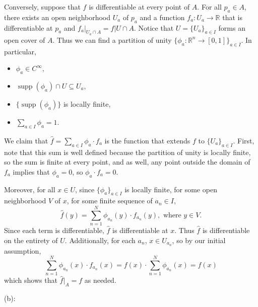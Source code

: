 \documentclass{article}
\theoremstyle{plain} %
\numberwithin{thm}{section} %
\theoremstyle{definition}
\begin{document}
\begin{question}{36}

        Conversely, suppose that \(f\) is differentiable at every point of \(A\). For all \(p_a \in A\), there exists an open neighborhood \(U_a\) of \(p_a\) and a function \(f_a : U_a \to \mathbb{R}\) that is differentiable at \(p_a\) and \(f_a \vert _{U_a \cap A} = f \vert U \cap A\). Notice that \(U = \{U_a\}_{a \in I}\) forms an open cover of \(A\). Thus we can find a partition of unity \(\{ \phi _a : \mathbb{R}^n \to [0,1]\}_{a\in I}\). In particular,
        \begin{itemize}
            \item \(\phi _a \in C^{\infty}\),
            \item \(\mathop{\mathrm{supp}}(\phi _a)\cap U \subseteq U_a\),
            \item \(\{\mathop{\mathrm{supp}}(\phi_a)\}\) is locally finite,
            \item \(\sum\limits_{a \in I} \phi _a = 1\).
        \end{itemize}
        We claim that \(\hat{f} = \sum_{a \in I} \phi _a \cdot f_a\) is the function that extends \(f\) to \(\{ U_a \} _{a \in I}\). First, note that this sum is well defined because the partition of unity is locally finite, so the sum is finite at every point, and as well, any point outside the domain of \(f_a\) implies that \(\phi _a = 0\), so \(\phi _a \cdot f_a = 0\).

        Moreover, for all \(x \in U\), since \(\{ \phi _a \}_{a \in I}\) is locally finite, for some open neighborhood \(V\) of \(x\), for some finite sequence of \(a_n \in I\),
        \[
            \hat{f}(y) = \sum_{n=1}^{N} \phi _{a_n} (y) \cdot f_{a_n}(y), \text{ where } y \in V.
        \]
        Since each term is differentiable, \(\hat{f}\) is differentiable at \(x\). Thus \(\hat{f}\) is differentiable on the entirety of \(U\). Additionally, for each \(a_n\), \(x \in U_{a_n}\), so by our initial assumption,
        \[
            \sum_{n=1}^{N} \phi _{a_n} (x) \cdot f_{a_n}(x) = f(x) \cdot \sum_{n=1}^{N} \phi _{a_n} (x) = f(x)
        \]
        which shows that \(\hat{f}\vert _A = f\) as needed.

        \medskip

        (b):

        
    \end{question}
    \newpage
\end{document}
